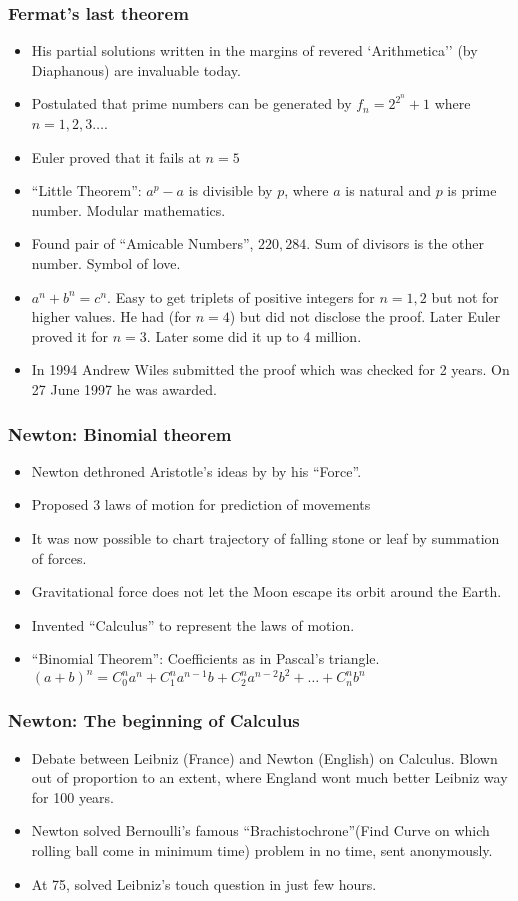 \begin{frame}[fragile]
\frametitle{Fermat's last theorem}
\begin{itemize}[label=\textbullet, noitemsep,nolistsep]
\item His partial solutions written in the margins of  revered `Arithmetica'' (by Diaphanous) are invaluable today.
\item Postulated that prime numbers can be generated by $f_n = 2^{2^n} +1$ where $n = 1,2,3 \ldots$. 
\item Euler proved that it fails at $n=5$
\item ``Little Theorem'': $a^p -a$ is divisible by $p$, where $a$ is natural and $p$ is prime number. Modular mathematics.
\item Found pair of ``Amicable Numbers'', $220,284$. Sum of divisors is the other number. Symbol of love.
\item $a^n + b^n = c^n$. Easy to get triplets of positive integers for $n=1,2$ but not for higher values. He had (for $n=4$) but did not disclose the proof. Later Euler proved it for $n=3$. Later some did it up to 4 million.
\item In 1994 Andrew Wiles submitted the proof which was checked for 2 years. On 27 June 1997 he was awarded.
\end{itemize}
\end{frame}

\begin{frame}[fragile]
\frametitle{Newton: Binomial theorem}
\begin{itemize}[label=\textbullet, noitemsep,nolistsep]
\item Newton dethroned Aristotle's ideas by by his ``Force''.
\item Proposed 3 laws of motion for prediction of movements
\item It was now possible to chart trajectory of falling stone or leaf by summation of forces.
\item Gravitational force does not let the Moon escape its orbit around the Earth.
\item Invented ``Calculus'' to represent the laws of motion.
\item ``Binomial Theorem'': Coefficients as in Pascal's triangle. $(a+b)^n = C^n_0 a^n + C^n_1 a^{n-1}b + C^n_2 a^{n-2} b^2 + \ldots + C^n_nb^n$
\end{itemize}
\end{frame}

\begin{frame}[fragile]
\frametitle{Newton: The beginning of Calculus}
\begin{itemize}[label=\textbullet, noitemsep,nolistsep]
\item Debate between Leibniz (France) and Newton (English) on Calculus. Blown out of proportion to an extent, where England wont much better Leibniz way for 100 years.
\item Newton solved Bernoulli's famous ``Brachistochrone''(Find Curve on which rolling ball come in minimum time) problem in no time, sent anonymously.
\item At 75, solved Leibniz's touch question in just few hours.
\end{itemize}
\end{frame}


